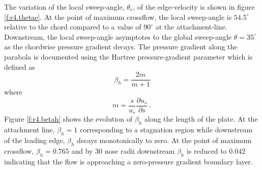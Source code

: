 The variation of the local sweep-angle, $\theta_e$, of the edge-velocity is
shown in figure \ref{f:r4.thetae}.  At the point of maximum crossflow, the
local sweep-angle is $54.5^\circ$ relative to the chord compared to a value of
$90^\circ$ at the attachment-line.  Downstream, the local sweep-angle
asymptotes to the global sweep-angle $\theta=35^\circ$ as the chordwise
pressure gradient decays.  The pressure gradient along the parabola is
documented using the Hartree pressure-gradient parameter which is defined as
%
\begin{equation} \label{e:betah}
  \beta_h = \frac{2 m}{m+1} 
\end{equation}
%
where
%
\begin{equation}
  m = \frac{s}{u_s} \frac{\partial u_s}{\partial s} \period
\end{equation}
%
Figure \ref{f:r4.betah} shows the evolution of $\beta_h$ along the length of
the plate.  At the attachment line, $\beta_h = 1$ corresponding to a
stagnation region while downstream of the leading edge, $\beta_h$ decays
monotonically to zero.  At the point of maximum crossflow, $\beta_h = 0.765$
and by 30 nose radii downstream $\beta_h$ is reduced to $0.042$ indicating
that the flow is approaching a zero-pressure gradient boundary layer.
%
%
%
%
%
%
%
%
%
%
%
%
%
%
%
%


